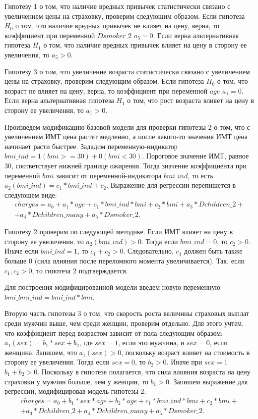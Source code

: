 \documentclass[a4paper,12pt]{article}
\begin{document}
Гипотезу 1 о том, что наличие вредных привычек статистически связано с увеличением цены на страховку, проверим следующим образом. Если гипотеза $H_0$ о том, что наличие вредных привычек не влияет на цену, верна, то коэффициент при переменной $Dsmoker\_2$ $a_5 = 0$. Если верна альтернативная гипотеза $H_1$ о том, что наличие вредных привычек влияет на цену в сторону ее увеличения, то $a_5 > 0$.

Гипотезу 3 о том, что увеличение возраста статистически связано с увеличением цены на страховку, проверим следующим образом. Если гипотеза $H_0$ о том, что возраст не влияет на цену, верна, то коэффициент при переменной $age$ $a_1 = 0$. Если верна альтернативная гипотеза $H_1$ о том, что рост возраста влияет на цену в сторону ее увеличения, то $a_1 > 0$.

Произведем модификацию базовой модели для проверки гипотезы 2 о том, что с увеличением ИМТ цена растет медленно, а после какого-то значения ИМТ цена начинает расти быстрее. Зададим переменную-индикатор $bmi\_ind = 1 (bmi >= 30) + 0 (bmi < 30)$. Пороговое значение ИМТ, равное 30, соответствует нижней границе ожирения. Тогда значение коэффициента при переменной $bmi$ зависит от переменной-индикатора $bmi\_ind$, то есть $a_2(bmi\_ind) = c_1 * bmi\_ind + c_2$. Выражение для регрессии перепишется в следующем виде:
\begin{align*}
	charges = a_0 + a_1 * age + c_1 * bmi\_ind * bmi + c_2 * bmi + a_3 * Dchildren\_2 + \\ + a_4 * Dchildren\_many + a_5 * Dsmoker\_2.
\end{align*}

Гипотезу 2 проверим по следующей методике. Если ИМТ влияет на цену в сторону ее увеличения, то $a_2(bmi\_ind) > 0$. Тогда если $bmi\_ind = 0$, то $c_2 > 0$. Иначе если $bmi\_ind = 1$, то $c_1 + c_2 > 0$. Следовательно, $c_1$ должен быть также больше 0 (сила влияния после переломного момента увеличивается). Так, если $c_1, c_2 > 0$, то гипотеза 2 подтверждается.

Для построения модифицированной модели введем новую переменную $bmi\_bmi\_ind = bmi\_ind * bmi$.

Вторую часть гипотезы 3 о том, что скорость роста величины страховых выплат среди мужчин выше, чем среди женщин, проверим отдельно. Для этого учтем, что коэффициент перед возрастом зависит от пола следующим образом: $a_1(sex) = b_1 * sex + b_2$, где $sex = 1$, если это мужчина, и $sex = 0$, если женщина. Запишем, что $a_1(sex) > 0$, поскольку возраст влияет на стоимость в сторону ее увеличения. Тогда если $sex = 0$, то $b_2 > 0$. Иначе при $sex = 1$ $b_1 + b_2 > 0$. Поскольку в гипотезе полагается, что сила влияния возраста на цену страховки у мужчин больше, чем у женщин, то $b_1 > 0$. Запишем выражение для регрессии, модифицировав модель гипотезы 2:
\begin{align*}
charges = a_0 +  b_1 * sex * age + b_2 * age + c_1 * bmi\_ind * bmi + c_2 * bmi + \\ + a_3 * Dchildren\_2 + a_4 * Dchildren\_many + a_5 * Dsmoker\_2.
\end{align*}
\end{document}

